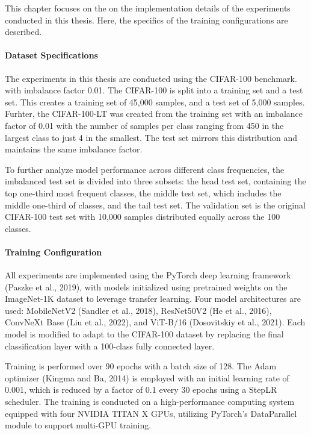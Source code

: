 
This chapter focuses on the on the implementation details of the experiments conducted in this thesis. Here, the specifics of the training configurations are described. 

\paragraph{Dataset Specifications}
The experiments in this thesis are conducted using the CIFAR-100 \cite{krizhevsky2009learning} benchmark. with imbalance factor 0.01. The CIFAR-100 is split into a training set and a test set. This creates a training set of 45,000 samples, and a test set of 5,000 samples. Furhter, the CIFAR-100-LT was created from the training set with an imbalance factor of 0.01 with the number of samples per class ranging from 450 in the largest class to just 4 in the smallest. The test set mirrors this distribution and maintains the same imbalance factor.

To further analyze model performance across different class frequencies, the imbalanced test set is divided into three subsets: the head test set, containing the top one-third most frequent classes, the middle test set, which includes the middle one-third of classes, and the tail test set. The validation set is the original CIFAR-100 test set with 10,000 samples distributed equally across the 100 classes.

\paragraph{Training Configuration}
All experiments are implemented using the PyTorch deep learning framework (Paszke et al., 2019), with models initialized using pretrained weights on the ImageNet-1K dataset to leverage transfer learning. Four model architectures are used: MobileNetV2 (Sandler et al., 2018), ResNet50V2 (He et al., 2016), ConvNeXt Base (Liu et al., 2022), and ViT-B/16 (Dosovitskiy et al., 2021). Each model is modified to adapt to the CIFAR-100 dataset by replacing the final classification layer with a 100-class fully connected layer.

Training is performed over 90 epochs with a batch size of 128. The Adam optimizer (Kingma and Ba, 2014) is employed with an initial learning rate of 0.001, which is reduced by a factor of 0.1 every 30 epochs using a StepLR scheduler. The training is conducted on a high-performance computing system equipped with four NVIDIA TITAN X GPUs, utilizing PyTorch's DataParallel module to support multi-GPU training.

